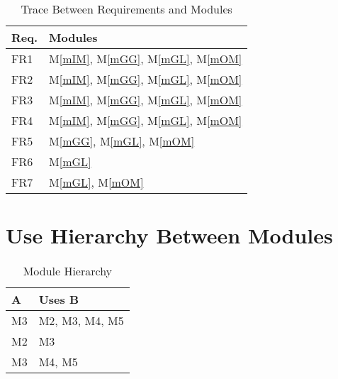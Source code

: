 \documentclass[12pt, titlepage]{article}
\newcommand{\mref}[1]{M\ref{#1}}
\begin{document}
\begin{table}[H]
\centering
\begin{tabular}{p{} p{}}
\toprule
\textbf{Req.} & \textbf{Modules}\\
\midrule
FR1 & \mref{mIM}, \mref{mGG}, \mref{mGL}, \mref{mOM}\\
FR2 & \mref{mIM}, \mref{mGG}, \mref{mGL}, \mref{mOM}\\
FR3 & \mref{mIM}, \mref{mGG}, \mref{mGL}, \mref{mOM}\\
FR4 & \mref{mIM}, \mref{mGG}, \mref{mGL}, \mref{mOM}\\
FR5 & \mref{mGG}, \mref{mGL}, \mref{mOM}\\
FR6 & \mref{mGL}\\
FR7 &  \mref{mGL}, \mref{mOM}\\
\bottomrule
\end{tabular}
\caption{Trace Between Requirements and Modules}
\label{TblRT}
\end{table}


\newpage
\section{Use Hierarchy Between Modules} \label{SecUse}
\begin{table}[h!]
\centering
\begin{tabular}{p{} p{}}
\toprule
\textbf{A} & \textbf{Uses B}\\
\midrule
{M3} & {M2, M3, M4, M5}\\
\midrule
{M2} & {M3}\\
\midrule
{M3} & {M4, M5}\\
\bottomrule
\end{tabular}
\caption{Module Hierarchy}
\label{TblMH}
\end{table}
\end{document}
